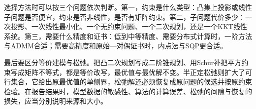 选择方法时可以按三个问题依次判断。第一，约束是什么类型：凸集上投影或线性子问题是否便宜，约束是否非线性，是否有矩阵约束。第二，子问题代价多少：一次投影、一次线性最小化、一个无约束问题、一个二次规划，还是一个KKT线性系统。第三，需要什么精度和证书：低到中等精度、需要分布式计算时，一阶方法与ADMM合适；需要高精度和原始—对偶证书时，内点法与SQP更合适。

最后要区分等价建模与松弛。把凸二次规划写成二阶锥规划、用Schur补把平方约束写成矩阵不等式，都是等价改写，最优值与最优解不变。半正定松弛则扩大了可行集合，它给出原最优值的单侧界，松弛解还必须恢复成原问题的候选并按原约束检验。在报告结果时，模型数据的敏感性、算法的计算误差、松弛的间隙与恢复的损失，应当分别说明来源和大小。
